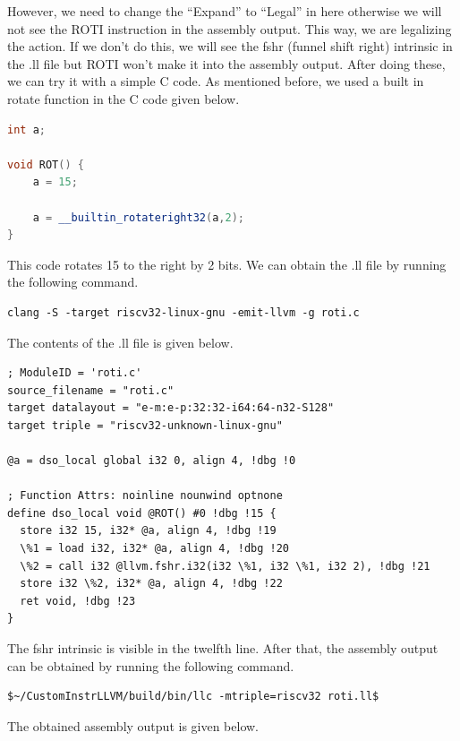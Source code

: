 However, we need to change the “Expand” to “Legal” in here otherwise we will not see the ROTI instruction in the assembly output.  This way, we are legalizing the action. If we don’t do this, we will see the fshr (funnel shift right) intrinsic in the .ll file but ROTI won’t make it into the assembly output. After doing these, we can try it with a simple C code. As mentioned before, we used a built in rotate function in the C code given below. 

\begin{lstlisting}[language=C++]
int a;

void ROT() {
	a = 15;
	
	a = __builtin_rotateright32(a,2);	
}
\end{lstlisting}

This code rotates 15 to the right by 2 bits. We can obtain the .ll file by running the following command.

\begin{lstlisting}
clang -S -target riscv32-linux-gnu -emit-llvm -g roti.c
\end{lstlisting}

The contents of the .ll file is given below.

\begin{lstlisting}
; ModuleID = 'roti.c'
source_filename = "roti.c"
target datalayout = "e-m:e-p:32:32-i64:64-n32-S128"
target triple = "riscv32-unknown-linux-gnu"

@a = dso_local global i32 0, align 4, !dbg !0

; Function Attrs: noinline nounwind optnone
define dso_local void @ROT() #0 !dbg !15 {
  store i32 15, i32* @a, align 4, !dbg !19
  \%1 = load i32, i32* @a, align 4, !dbg !20
  \%2 = call i32 @llvm.fshr.i32(i32 \%1, i32 \%1, i32 2), !dbg !21
  store i32 \%2, i32* @a, align 4, !dbg !22
  ret void, !dbg !23
}
\end{lstlisting}

The fshr intrinsic is visible in the twelfth line. After that, the assembly output can be obtained by running the following command. 

\begin{lstlisting}
$~/CustomInstrLLVM/build/bin/llc -mtriple=riscv32 roti.ll$
\end{lstlisting}

The obtained assembly output is given below.

